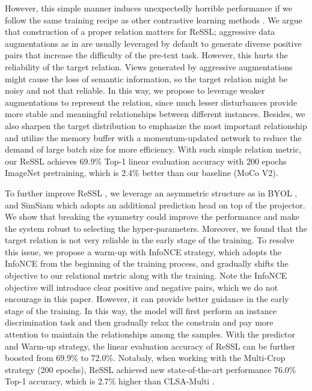 \documentclass{article}
\newcommand{\<}{\left\langle}
\renewcommand{\>}{\right\rangle}
\begin{document}
However, this simple manner induces unexpectedly horrible performance if we follow the same training recipe as other contrastive learning methods \cite{simclr, moco}. We argue that construction of a proper relation matters for ReSSL; aggressive data augmentations as in \cite{simclr, simclrv2, goodview} are usually leveraged by default to generate diverse positive pairs that increase the difficulty of the pre-text task. However, this hurts the reliability of the target relation. Views generated by aggressive augmentations might cause the loss of semantic information, so the target relation might be noisy and not that reliable. In this way, we propose to leverage weaker augmentations to represent the relation, since much lesser disturbances provide more stable and meaningful relationships between different instances. Besides, we also sharpen the target distribution to emphasize the most important relationship and utilize the memory buffer with a momentum-updated network to reduce the demand of large batch size for more efficiency. With such simple relation metric, our ReSSL \cite{ressl} achieves 69.9\% Top-1 linear evaluation accuracy with 200 epochs ImageNet pretraining, which is 2.4\% better than our baseline (MoCo V2).

To further improve ReSSL \cite{ressl}, we leverage an asymmetric structure as in BYOL \cite{byol}, and SimSiam \cite{SimSiam} which adopts an additional prediction head on top of the projector. We show that breaking the symmetry could improve the performance and make the system robust to selecting the hyper-parameters. Moreover, we found that the target relation is not very reliable in the early stage of the training. To resolve this issue, we propose a warm-up with InfoNCE strategy, which adopts the InfoNCE from the beginning of the training process, and gradually shifts the objective to our relational metric along with the training. Note the InfoNCE objective will introduce clear positive and negative pairs, which we do not encourage in this paper. However, it can provide better guidance in the early stage of the training. In this way, the model will first perform an instance discrimination task and then gradually relax the constrain and pay more attention to maintain the relationships among the samples. With the predictor and Warm-up strategy, the linear evaluation accuracy of ReSSL can be further boosted from 69.9\% to 72.0\%. Notabaly, when working with the Multi-Crop strategy (200 epochs), ReSSL achieved new state-of-the-art performance 76.0\% Top-1 accuracy, which is 2.7\% higher than CLSA-Multi \cite{stronger}.
\end{document}
